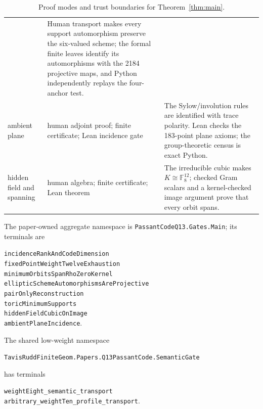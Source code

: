 \documentclass[11pt]{article}
\theoremstyle{definition}
\theoremstyle{remark}
\newcommand{\F}{\mathbb F}
\begin{document}
\begin{table}[!ht]
\begin{tabular}{@{}>{\raggedright\arraybackslash}p{}
  >{\raggedright\arraybackslash}p{}
  >{\raggedright\arraybackslash}p{}@{}}
& Human transport makes every support automorphism preserve the six-valued
  scheme; the formal finite leaves identify its automorphisms with the 2184
  projective maps, and Python independently replays the four-anchor test.\\
ambient plane
& human adjoint proof; finite certificate; Lean incidence gate
& The Sylow/involution rules are identified with trace polarity.  Lean checks
  the 183-point plane axioms; the group-theoretic census is exact Python.\\
hidden field and spanning
& human algebra; finite certificate; Lean theorem
& The irreducible cubic makes \(K\cong\F_8^{12}\); checked Gram scalars and a
  kernel-checked image argument prove that every orbit spans.\\
\bottomrule
\end{tabular}
\caption{Proof modes and trust boundaries for Theorem~\ref{thm:main}.}
\label{tab:trust}
\end{table}

The paper-owned aggregate namespace is
\nolinkurl{PassantCodeQ13.Gates.Main}; its terminals are
\begin{flushleft}
\small
\nolinkurl{incidenceRankAndCodeDimension}\\
\nolinkurl{fixedPointWeightTwelveExhaustion}\\
\nolinkurl{minimumOrbitsSpanRhoZeroKernel}\\
\nolinkurl{ellipticSchemeAutomorphismsAreProjective}\\
\nolinkurl{pairOnlyReconstruction}\\
\nolinkurl{toricMinimumSupports}\\
\nolinkurl{hiddenFieldCubicOnImage}\\
\nolinkurl{ambientPlaneIncidence}.
\end{flushleft}
The shared low-weight namespace
\begin{flushleft}
\small
\nolinkurl{TavisRuddFiniteGeom.Papers.Q13PassantCode.SemanticGate}
\end{flushleft}
has terminals
\begin{flushleft}
\small
\nolinkurl{weightEight_semantic_transport}\\
\nolinkurl{arbitrary_weightTen_profile_transport}.
\end{flushleft}
\end{document}
